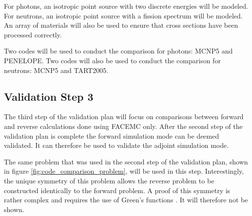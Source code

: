 For photons, an isotropic point source with two discrete energies will
be modeled. For neutrons, an isotropic point source with a fission spectrum 
will be modeled. An array of materials will also be used to ensure that cross 
sections have been processed correctly. 

Two codes will be used to conduct the comparison for photons: MCNP5 and 
PENELOPE. Two codes will also be used to conduct the comparison for neutrons:
MCNP5 and TART2005. 

\subsection{Validation Step 3}
The third step of the validation plan will focus on comparisons between forward
and reverse calculations done using FACEMC only. After the second step of the
validation plan is complete the forward simulation mode can be deemed 
validated. It can therefore be used to validate the adjoint simulation mode. 

The same problem that was used in the second step of the validation
plan, shown in figure \ref{fig:code_comparison_problem}, will be used in this
step. Interestingly, the unique symmetry of this problem allows the reverse
problem to be constructed identically to the forward problem. A proof of this
symmetry is rather complex and requires the use of Green's functions 
\citep{bell_nuclear_1979}. It will therefore not be shown.

